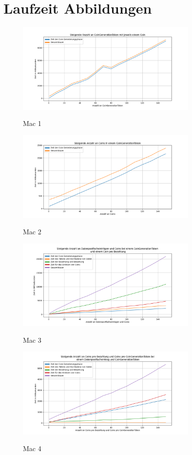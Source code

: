 \documentclass[
	fontsize=12pt,
	headings=small,
	parskip=half,           %
	bibliography=totoc,
	numbers=noenddot,       %
	open=any,               %
]{scrreprt}
\begin{document}
\chapter{Laufzeit Abbildungen}
\begin{figure}[H]
    \caption{Mac 1}
    \centering
    \includegraphics[width=0.8\textwidth]{figure_mac_1.png}
    \label{fig:mac_1}
\end{figure}
\begin{figure}[H]
    \caption{Mac 2}
    \centering
    \includegraphics[width=0.8\textwidth]{figure_mac_2.png}
    \label{fig:mac_2}
\end{figure}
\begin{figure}[H]
    \caption{Mac 3}
    \centering
    \includegraphics[width=0.8\textwidth]{figure_mac_3.png}
    \label{fig:mac_3}
\end{figure}
\begin{figure}[H]
    \caption{Mac 4}
    \centering
    \includegraphics[width=0.8\textwidth]{figure_mac_4.png}
    \label{fig:mac_4}
\end{figure}
\end{document}
